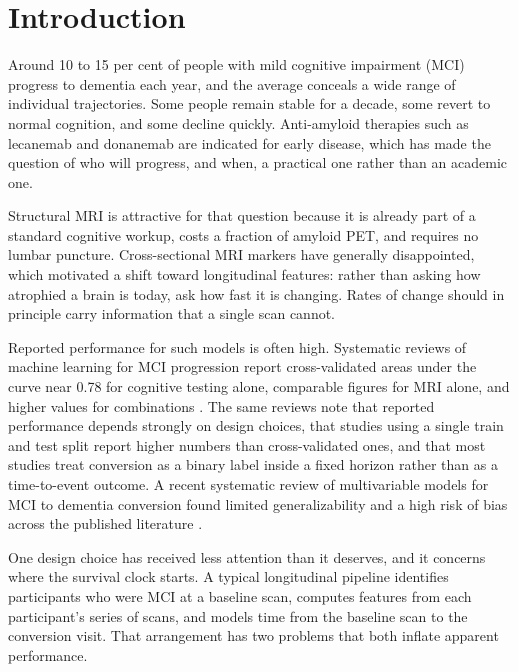 \documentclass[blue]{ludusofficial}
\begin{document}
\maketitle

\doublespacing

\section{Introduction}

Around 10 to 15 per cent of people with mild cognitive impairment (MCI) progress to dementia each year, and the average conceals a wide range of individual trajectories. Some people remain stable for a decade, some revert to normal cognition, and some decline quickly. Anti-amyloid therapies such as lecanemab and donanemab are indicated for early disease, which has made the question of who will progress, and when, a practical one rather than an academic one.

Structural MRI is attractive for that question because it is already part of a standard cognitive workup, costs a fraction of amyloid PET, and requires no lumbar puncture. Cross-sectional MRI markers have generally disappointed, which motivated a shift toward longitudinal features: rather than asking how atrophied a brain is today, ask how fast it is changing. Rates of change should in principle carry information that a single scan cannot.

Reported performance for such models is often high. Systematic reviews of machine learning for MCI progression report cross-validated areas under the curve near 0.78 for cognitive testing alone, comparable figures for MRI alone, and higher values for combinations \cite{ansart2021predicting, grueso2021machine}. The same reviews note that reported performance depends strongly on design choices, that studies using a single train and test split report higher numbers than cross-validated ones, and that most studies treat conversion as a binary label inside a fixed horizon rather than as a time-to-event outcome. A recent systematic review of multivariable models for MCI to dementia conversion found limited generalizability and a high risk of bias across the published literature \cite{vermeulen2025review}.

One design choice has received less attention than it deserves, and it concerns where the survival clock starts. A typical longitudinal pipeline identifies participants who were MCI at a baseline scan, computes features from each participant's series of scans, and models time from the baseline scan to the conversion visit. That arrangement has two problems that both inflate apparent performance.
\end{document}
